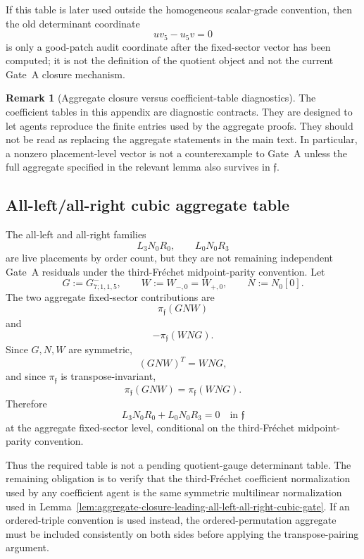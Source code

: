 \documentclass[11pt,a4paper]{amsart}
\theoremstyle{plain}
\theoremstyle{definition}
\newtheorem{remark}[theorem]{Remark}
\begin{document}
If this table is later used outside the homogeneous scalar-grade
convention, then the old determinant coordinate
\[
uv_5-u_5v=0
\]
is only a good-patch audit coordinate after the fixed-sector vector has
been computed; it is not the definition of the quotient object and not the
current Gate~A closure mechanism.

\begin{remark}[Aggregate closure versus coefficient-table diagnostics]
\label{rem:aggregate-closure-versus-coefficient-table-diagnostics}
The coefficient tables in this appendix are diagnostic contracts.  They
are designed to let agents reproduce the finite entries used by the
aggregate proofs.  They should not be read as replacing the aggregate
statements in the main text.  In particular, a nonzero placement-level
vector is not a counterexample to Gate~A unless the full aggregate
specified in the relevant lemma also survives in \(\mathfrak f\).
\end{remark}

\subsection{All-left/all-right cubic aggregate table}
\label{app:all-left-all-right-cubic-aggregate-table}

The all-left and all-right families
\[
L_3N_0R_0,
\qquad
L_0N_0R_3
\]
are live placements by order count, but they are not remaining
independent Gate~A residuals under the third-Fr\'echet midpoint-parity
convention.  Let
\[
G:=G^-_{7;1,1,5},
\qquad
W:=W_{-,0}=W_{+,0},
\qquad
N:=N_0[0].
\]
The two aggregate fixed-sector contributions are
\[
\pi_{\mathfrak f}(GNW)
\]
and
\[
-\pi_{\mathfrak f}(WNG).
\]
Since \(G,N,W\) are symmetric,
\[
(GNW)^T=WNG,
\]
and since \(\pi_{\mathfrak f}\) is transpose-invariant,
\[
\pi_{\mathfrak f}(GNW)=\pi_{\mathfrak f}(WNG).
\]
Therefore
\[
L_3N_0R_0+L_0N_0R_3=0
\quad\text{in }\mathfrak f
\]
at the aggregate fixed-sector level, conditional on the third-Fr\'echet
midpoint-parity convention.

Thus the required table is not a pending quotient-gauge determinant
table.  The remaining obligation is to verify that the third-Fr\'echet
coefficient normalization used by any coefficient agent is the same
symmetric multilinear normalization used in
Lemma~\ref{lem:aggregate-closure-leading-all-left-all-right-cubic-gate}.
If an ordered-triple convention is used instead, the ordered-permutation
aggregate must be included consistently on both sides before applying the
transpose-pairing argument.
\end{document}
